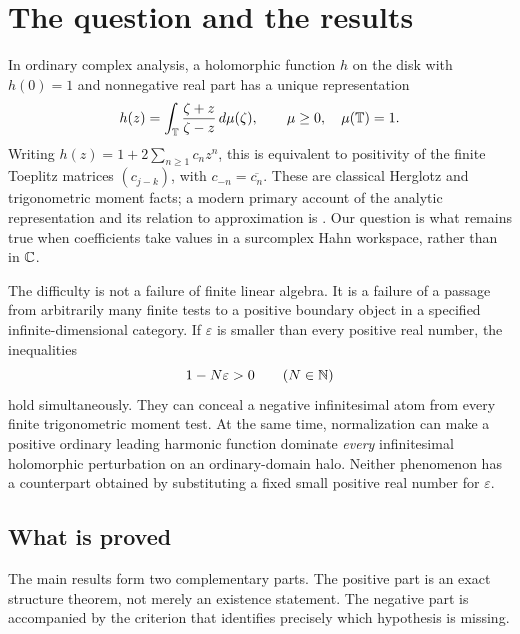 \documentclass[11pt,letterpaper]{article}
\theoremstyle{definition}
\newcommand{\eps}{\varepsilon}
\newcommand{\dd}{\,d}
\numberwithin{equation}{section}
\begin{document}
\section{The question and the results}
\label{herg:sec:intro}

In ordinary complex analysis, a holomorphic function $h$ on the disk with $h(0)=1$ and nonnegative real part has a unique representation
\begin{equation}\label{herg:eq:classical}
 h(z)=\int_\T\frac{\zeta+z}{\zeta-z}\dd\mu(\zeta),
 \qquad \mu\ge0,\quad \mu(\T)=1.
\end{equation}
Writing $h(z)=1+2\sum_{n\ge1}c_nz^n$, this is equivalent to positivity of the finite Toeplitz matrices $(c_{j-k})$, with $c_{-n}=\overline{c_n}$. These are classical Herglotz and trigonometric moment facts; a modern primary account of the analytic representation and its relation to approximation is \cite{BBK}. Our question is what remains true when coefficients take values in a surcomplex Hahn workspace, rather than in $\mathbb C$.

The difficulty is not a failure of finite linear algebra. It is a failure of a passage from arbitrarily many finite tests to a positive boundary object in a specified infinite-dimensional category. If $\eps$ is smaller than every positive real number, the inequalities
\begin{equation}\label{herg:eq:basicpositivity}
 1-N\eps>0\qquad(N\in\N)
\end{equation}
hold simultaneously. They can conceal a negative infinitesimal atom from every finite trigonometric moment test. At the same time, normalization can make a positive ordinary leading harmonic function dominate \emph{every} infinitesimal holomorphic perturbation on an ordinary-domain halo. Neither phenomenon has a counterpart obtained by substituting a fixed small positive real number for $\eps$.

\subsection{What is proved}

The main results form two complementary parts. The positive part is an exact structure theorem, not merely an existence statement. The negative part is accompanied by the criterion that identifies precisely which hypothesis is missing.
\end{document}
